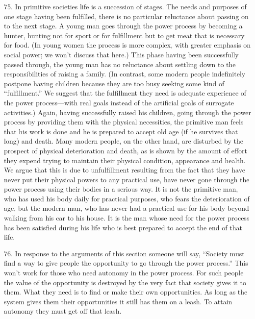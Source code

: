 \documentclass{article}
\begin{document}
75.  In  primitive  societies  life  is  a  succession  of  stages.   The  needs  and  purposes  of  one  stage  
having been fulfilled, there is no particular reluctance about passing on to the next stage.  A young 
man goes through the power process by becoming a hunter, hunting not for sport or for fulfillment 
but to get meat that is necessary for food.  (In young women the process is more complex, with 
greater emphasis on social power; we won’t discuss that here.) This phase having been successfully 
passed  through,  the  young  man  has  no  reluctance  about  settling  down  to  the  responsibilities  of  
raising a family. (In contrast, some modern people indefinitely postpone having children because 
they are too busy seeking some kind of “fulfillment.” We suggest that the fulfillment they need is 
adequate  experience  of  the  power  process—with  real  goals  instead  of  the  artificial  goals  of  
surrogate  activities.)  Again,  having  successfully  raised  his  children,  going  through  the  power  
process by providing them with the physical necessities, the primitive man feels that his work is 
done  and  he  is  prepared  to  accept  old  age  (if  he  survives  that  long)  and  death.   Many  modern  
people, on the other hand, are disturbed by the prospect of physical deterioration and death, as is 
shown by the amount of effort they expend trying to maintain their physical condition, appearance 
and health.  We argue that this is due to unfulfillment resulting from the fact that they have never 
put their physical powers to any practical use, have never gone through the power process using 
their bodies in a serious way.  It is not the primitive man, who has used his body daily for practical 
purposes, who fears the deterioration of age, but the modern man, who has never had a practical 
use for his body beyond walking from his car to his house.  It is the man whose need for the power 
process has been satisfied during his life who is best prepared to accept the end of that life. \vspace{\baselineskip}

76.  In response to the arguments of this section someone will say, “Society must find a way to 
give people the opportunity to go through the power process.” This won’t work for those who need 
autonomy in the power process.  For such people the value of the opportunity is destroyed by the 
very fact that society gives it to them.  What they need is to find or make their own 
opportunities.  As long as the system gives them their opportunities it still has them on a leash.  To 
attain autonomy they must get off that leash. \newpage
\end{document}
